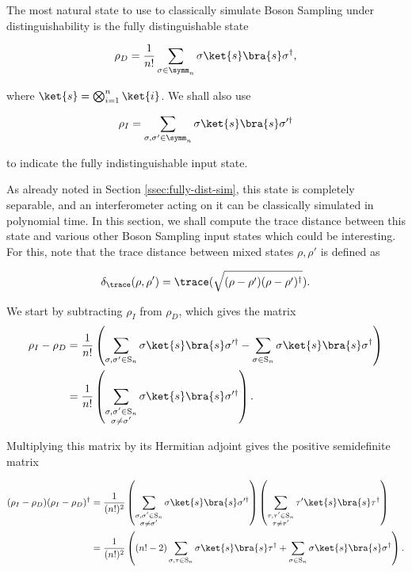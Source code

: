 The most natural state to use to classically simulate Boson Sampling under distinguishability is the fully distinguishable state

\begin{equation}
\rho_D = \frac{1}{n!}\sum_{\sigma\in\symm_n}\sigma\ket{s}\bra{s}\sigma^\dagger,
\end{equation}

\noindent where $\ket{s} = \bigotimes_{i=1}^n\ket{i}$. We shall also use 

\begin{equation}
\rho_I = \sum_{\sigma, \sigma' \in \symm_n}\sigma\ket{s}\bra{s}\sigma'^\dagger
\end{equation}

\noindent to indicate the fully indistinguishable input state.

As already noted in Section \ref{ssec:fully-dist-sim}, this state is completely separable, and an interferometer acting on it can be classically simulated in polynomial time. In this section, we shall compute the trace distance between this state and various other Boson Sampling input states which could be interesting. For this, note that the trace distance between mixed states $\rho, \rho'$ is defined as

\begin{equation}
\delta_{\trace}
(\rho, \rho') = \trace(\sqrt{(\rho - \rho')(\rho-\rho')^\dagger}).
\end{equation}

We start by subtracting $\rho_I$ from $\rho_D$, which gives the matrix\begin{align}
\rho_I - \rho_D &= \frac{1}{n!}\left(\sum_{\sigma,\sigma'\in\textrm{S}_n}\sigma\ket{s}\bra{s}\sigma'^\dagger - \sum_{\sigma \in \textrm{S}_n}\sigma\ket{s}\bra{s}\sigma^\dagger\right)\\
&= \frac{1}{n!}\left(\sum_{\substack{\sigma,\sigma'\in\textrm{S}_n\\\sigma\neq\sigma'}}\sigma\ket{s}\bra{s}\sigma'^\dagger\right).
\end{align}

Multiplying this matrix by its Hermitian adjoint gives the positive semidefinite matrix

\begin{align}
(\rho_I - \rho_D)(\rho_I - \rho_D)^\dagger &= \frac{1}{(n!)^2}\left(\sum_{\substack{\sigma,\sigma'\in\textrm{S}_n\\\sigma\neq\sigma'}}\sigma\ket{s}\bra{s}\sigma'^\dagger\right)\left(\sum_{\substack{\tau,\tau'\in\textrm{S}_n\\\tau\neq\tau'}}\tau'\ket{s}\bra{s}\tau^\dagger\right)\\
&= \frac{1}{(n!)^2}\left((n! - 2)\sum_{\sigma,\tau\in\textrm{S}_n}\sigma\ket{s}\bra{s}\tau^\dagger + \sum_{\sigma \in \textrm{S}_n}\sigma\ket{s}\bra{s}\sigma^\dagger\right).
\end{align}

